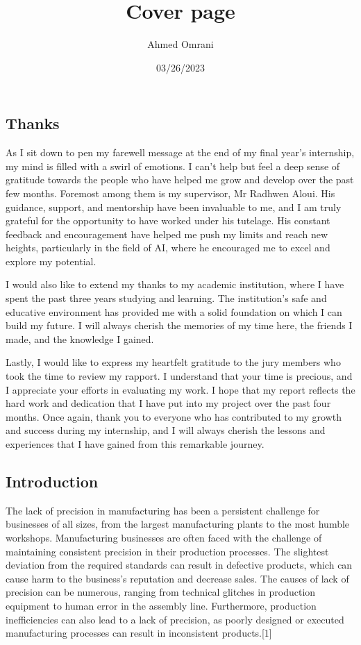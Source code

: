 \documentclass{report}
\title{Cover page}
\date{03/26/2023}
\author{Ahmed Omrani}
\begin{document}
  \maketitle

  \newpage
{}
\begin{center}
\section*{Thanks}
\end{center}
  As I sit down to pen my farewell message at the end of my final year's internship, my mind is filled with a swirl of emotions. I can't help but feel a deep sense of gratitude towards the people who have helped me grow and develop over the past few months. Foremost among them is my supervisor, Mr Radhwen Aloui. His guidance, support, and mentorship have been invaluable to me, and I am truly grateful for the opportunity to have worked under his tutelage. His constant feedback and encouragement have helped me push my limits and reach new heights, particularly in the field of AI, where he encouraged me to excel and explore my potential.

I would also like to extend my thanks to my academic institution, where I have spent the past three years studying and learning. The institution's safe and educative environment has provided me with a solid foundation on which I can build my future. I will always cherish the memories of my time here, the friends I made, and the knowledge I gained.

Lastly, I would like to express my heartfelt gratitude to the jury members who took the time to review my rapport. I understand that your time is precious, and I appreciate your efforts in evaluating my work. I hope that my report reflects the hard work and dedication that I have put into my project over the past four months. Once again, thank you to everyone who has contributed to my growth and success during my internship, and I will always cherish the lessons and experiences that I have gained from this remarkable journey.
  \newpage
\tableofcontents

  \newpage
\begin{center}
\section*{Introduction}
\end{center}
The lack of precision in manufacturing has been a persistent challenge for businesses of all sizes, from the largest manufacturing plants to the most humble workshops.
Manufacturing businesses are often faced with the challenge of maintaining consistent precision in their production processes. The slightest deviation from the required standards can result in defective products, which can cause harm to the business's reputation and decrease sales. The causes of lack of precision can be numerous, ranging from technical glitches in production equipment to human error in the assembly line. Furthermore, production inefficiencies can also lead to a lack of precision, as poorly designed or executed manufacturing processes can result in inconsistent products.[1]
\end{document}
